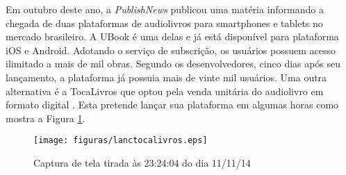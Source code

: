 Em outubro deste ano, a \textit{PublishNews} publicou uma matéria informando a chegada de duas plataformas de audiolivros para smartphones e tablets no mercado brasileiro. A UBook é uma delas e já está disponível para plataforma iOS e Android. Adotando o serviço de subscrição, os usuários possuem acesso ilimitado a mais de mil obras. Segundo os desenvolvedores, cinco dias após seu lançamento, a plataforma já possuia mais de vinte mil usuários. Uma outra alternativa é a TocaLivros que optou pela venda unitária do audiolivro em formato digital \cite{publishnews}. Esta pretende lançar sua plataforma em algumas horas como mostra a Figura \ref{lanctocalivros}.

 \begin{figure}[ht]
	\centering
		\texttt{[image: figuras/lanctocalivros.eps]}
	\caption{Captura de tela tirada às 23:24:04 do dia 11/11/14 \cite{tocalivros}}
	\label{lanctocalivros}
\end{figure}

%
%
%
%
%


